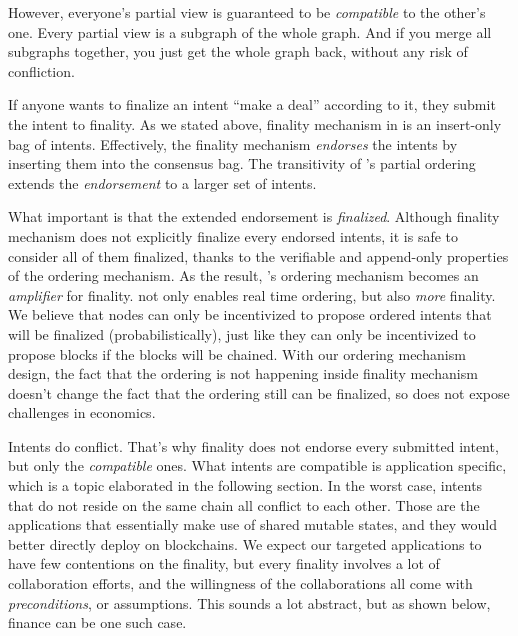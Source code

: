 However, everyone's partial view is guaranteed to be \emph{compatible} to the other's one.
Every partial view is a subgraph of the whole graph.
And if you merge all subgraphs together, you just get the whole graph back, without any risk of confliction.

If anyone wants to finalize an intent \ie ``make a deal'' according to it, they submit the intent to finality.
As we stated above, finality mechanism in \sys is an insert-only bag of intents.
Effectively, the finality mechanism \emph{endorses} the intents by inserting them into the consensus bag.
The transitivity of \sys's partial ordering extends the \emph{endorsement} to a larger set of intents.

What important is that the extended endorsement is \emph{finalized}.
Although finality mechanism does not explicitly finalize every endorsed intents, it is safe to consider all of them finalized, thanks to the verifiable and append-only properties of the ordering mechanism.
As the result, \sys's ordering mechanism becomes an \emph{amplifier} for finality.
\sys not only enables real time ordering, but also \emph{more} finality.
We believe that nodes can only be incentivized to propose ordered intents that will be finalized (probabilistically), just like they can only be incentivized to propose blocks if the blocks will be chained.
With our ordering mechanism design, the fact that the ordering is not happening inside finality mechanism doesn't change the fact that the ordering still can be finalized, so \sys does not expose challenges in economics.


Intents do conflict.
That's why finality does not endorse every submitted intent, but only the \emph{compatible} ones.
What intents are compatible is application specific, which is a topic elaborated in the following section.
In the worst case, intents that do not reside on the same chain all conflict to each other.
Those are the applications that essentially make use of shared mutable states, and they would better directly deploy on blockchains.
We expect our targeted applications to have few contentions on the finality, but every finality involves a lot of collaboration efforts, and the willingness of the collaborations all come with \emph{preconditions}, or assumptions.
This sounds a lot abstract, but as shown below, finance can be one such case.

